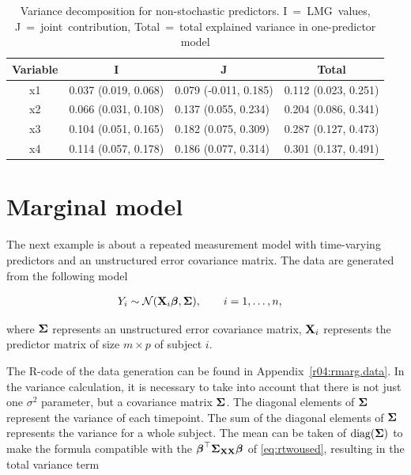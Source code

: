 \documentclass[11pt,a4paper,twoside]{book}
\begin{document}
\begin{table}[h]
\caption{Variance decomposition for non-stochastic predictors. I~=~LMG~values,   J~=~joint~contribution, Total~=~total explained variance in one-predictor model}
\centering
\begin{tabular}{clll}
  \toprule
  \multicolumn{1}{c}{\textbf{Variable}} & \multicolumn{1}{c}{\textbf{I}} &\multicolumn{1}{c}{\textbf{J}} & \multicolumn{1}{c}{\textbf{Total}} \\
  \hline
x1 & 0.037 (0.019, 0.068)  & 0.079 (-0.011, 0.185)   & 0.112 (0.023, 0.251)  \\ 
x2 & 0.066 (0.031, 0.108)  & 0.137 (0.055, 0.234)   & 0.204 (0.086, 0.341)  \\ 
x3 & 0.104 (0.051, 0.165)  & 0.182 (0.075, 0.309)   & 0.287 (0.127, 0.473)  \\ 
x4 & 0.114 (0.057, 0.178)  & 0.186 (0.077, 0.314)   & 0.301 (0.137, 0.491)  \\ 
   \bottomrule
\end{tabular}
\label{tbl:repeatedcormod.tot}
\end{table}



\section{Marginal  model}

The next example is about a repeated measurement model with time-varying predictors and an unstructured error covariance matrix. The data are generated from the following model

\begin{align} 
&Y_{i} \sim \mathcal{N}({\mathbf{X}}_{i} {\boldsymbol{\beta}}, {\boldsymbol{\Sigma}}{}), \qquad i = 1, \dots, n ,
\end{align} 

where ${\boldsymbol{\Sigma}}{}$ represents an unstructured error covariance matrix, ${\mathbf{X}}_{i}$ represents the predictor matrix of size $m \times p$ of subject $i$.

The R-code of the data generation can be found in Appendix~\ref{r04:rmarg.data}. In the variance calculation, it is necessary to take into account that there is not just one $\sigma^2$ parameter, but a covariance matrix ${\boldsymbol{\Sigma}}{}$. The diagonal elements of ${\boldsymbol{\Sigma}}{}$ represent the variance of each timepoint. The sum of the diagonal elements of ${\boldsymbol{\Sigma}}{}$ represents the variance for a whole subject. The mean can be taken of $\operatorname{diag}({\boldsymbol{\Sigma}}{})$ to make the formula compatible with the ${\boldsymbol{\beta}}^\top {\boldsymbol{\Sigma}}{}_{{\mathbf{X}} {\mathbf{X}}}  {\boldsymbol{\beta}}$ of \eqref{eq:rtwoused}, resulting in the total variance term
\end{document}
